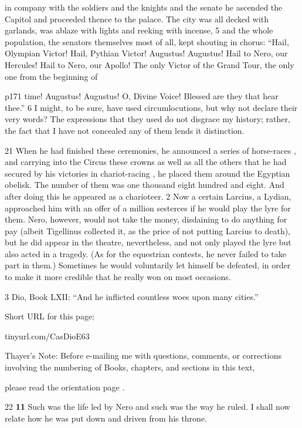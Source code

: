in company with the soldiers and the knights and the senate he ascended the Capitol and proceeded thence to the palace. The city was all decked with garlands, was ablaze with lights and reeking with incense, 5 and the whole population, the senators themselves most of all, kept shouting in chorus: ``Hail, Olympian Victor! Hail, Pythian Victor! Augustus! Augustus! Hail to Nero, our Hercules! Hail to Nero, our Apollo! The only Victor of the Grand Tour, the only one from the beginning of

p171 time! Augustus! Augustus! O, Divine Voice! Blessed are they that hear thee.'' 6 I might, to be sure, have used circumlocutions, but why not declare their very words? The expressions that they used do not disgrace my history; rather, the fact that I have not concealed any of them lends it distinction.

21
When he had finished these ceremonies, he announced a series of horse-races , and carrying into the Circus these crowns as well as all the others that he had secured by his victories in chariot-racing , he placed them around the Egyptian obelisk. The number of them was one thousand eight hundred and eight. And after doing this he appeared as a charioteer. 2 Now a certain Larcius, a Lydian, approached him with an offer of a million sesterces if he would play the lyre for them. Nero, however, would not take the money, disdaining to do anything for pay (albeit Tigellinus collected it, as the price of not putting Larcius to death), but he did appear in the theatre, nevertheless, and not only played the lyre but also acted in a tragedy. (As for the equestrian contests, he never failed to take part in them.) Sometimes he would voluntarily let himself be defeated, in order to make it more credible that he really won on most occasions.

3
Dio, Book LXII: ``And he inflicted countless woes upon many cities.''


Short URL for this page:

tinyurl.com/CasDioE63

Thayer's Note: Before e-mailing me with questions, comments, or corrections involving the numbering of Books, chapters, and sections in this text,

please read the orientation page .

22
\textbf{11} Such was the life led by Nero and such was the way he ruled. I shall now relate how he was put down and driven from his throne.

